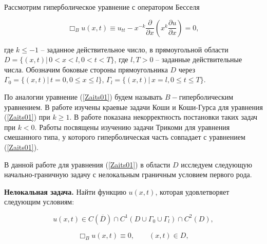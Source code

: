 
Рассмотрим гиперболическое уравнение с оператором Бесселя

\begin{equation}

\label{Zaits01}

\Box_Bu(x,t)\equiv u_{tt}-x^{-k}\frac{\partial}{\partial x}\left(x^k\frac{\partial u}{\partial x}\right)=0,

\end{equation}

где $k\leq-1$ -- заданное действительное число, в прямоугольной области $D=\{(x,t)|\,0<x<l,0<t<T\}$, где $l,T>0$ -- заданные действительные числа. Обозначим боковые стороны прямоугольника $D$  через $\Gamma_0=\{(x,t)|\,t=0,0\leq x\leq l\}$, $\Gamma_l=\{(x,t)|\,x=l,0\leq t\leq T\}$.



По аналогии \cite{Zaitseva:Kipr} уравнение (\ref{Zaits01}) будем называть $B-$гиперболическим уравнением. В работе \cite[c.~164 -- 225]{Zaitseva:Pulk1} изучены краевые задачи Коши и Коши-Гурса для уравнения (\ref{Zaits01}) при $k\geq1$. В работе \cite{Zaitseva:Pulk2} показана некорректность постановки таких задач при $k<0$. Работы \cite{Zaitseva:SKBIRR1,Zaitseva:SKBIRR2} посвящены изучению задачи Трикоми для уравнения смешанного типа, у которого гиперболическая часть совпадает с уравнением (\ref{Zaits01}).



В данной работе для уравнения (\ref{Zaits01}) в области $D$ исследуем следующую начально-граничную задачу с нелокальным граничным условием первого рода.



{\bf Нелокальная задача.} Найти функцию $u(x,t)$, которая удовлетворяет следующим условиям:

\begin{equation}

\label{Zaits02}

u(x,t)\in C(\overline{D})\cap C^1(D\cup \Gamma_0\cup \Gamma_l)\cap C^2(D),

\end{equation}

\begin{equation}

\label{Zaits03}

\Box_Bu(x,t)\equiv 0,\qquad (x,t)\in D,

\end{equation}

